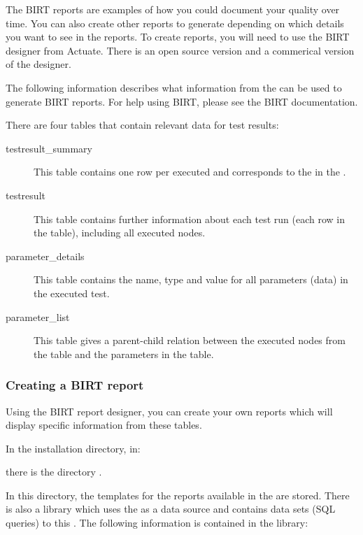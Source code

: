 The BIRT reports are examples of how you could document your quality over time. You can also create other reports to generate depending on which details you want to see in the reports. To create reports, you will need to use the BIRT designer from Actuate. There is an open source version and a commerical version of the designer. 

The following information describes what information from the \gddb{} can be used to generate BIRT reports. For help using BIRT, please see the BIRT documentation. 

There are four \gddb{} tables that contain relevant data for test results:

\begin{description}
\item [testresult\_summary]{This table contains one row per executed \gdsuite{} and corresponds to the \gdtestsummaryview{} in the \ite{}.}
\item [testresult]{This table contains further information about each test run (each row in the  table), including all executed nodes. }
\item [parameter\_details]{This table contains the name, type and value for all parameters (data) in the executed test.}
\item [parameter\_list]{This table gives a parent-child relation between the executed nodes from the  table and the parameters in the  table.}
\end{description}

\subsubsection{Creating a BIRT report}
Using the BIRT report designer, you can create your own reports which will display specific information from these tables. 

In the installation directory, in:


there is the directory . 

In this directory, the templates for the reports available in the \ite{} are stored. There is also a library which uses the \gddb{} as a data source and contains data sets (SQL queries) to this \gddb{}. The following information is contained in the library:

